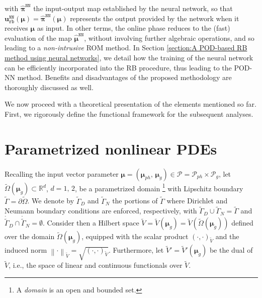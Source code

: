 \documentclass[12pt, a4paper, twoside, openright, notitlepage]{report}
\numberwithin{equation}{chapter}
\theoremstyle{theorem}
\theoremstyle{definition}
\theoremstyle{remark}
\theoremstyle{proposition}
\numberwithin{figure}{chapter}
\newcommand{\norm}[1]{\left\lVert#1\right\rVert}
\newcommand{\wt}[1]{\widetilde{#1}}
\newcommand{\bg}[1]{\boldsymbol{#1}}
\begin{document}
		with $\hat{\bg{\pi}}^{\texttt{NN}}$ the input-output map established by the neural network, so that $\mathbf{u}_{\texttt{rb}}^{\texttt{NN}}(\bg{\mu}) = \hat{\bg{\pi}}^{\texttt{NN}}(\bg{\mu})$ represents the output provided by the network when it receives $\bg{\mu}$ as input. In other terms, the online phase reduces to the (fast) evaluation of the map $\hat{\bg{\mu}}^{\texttt{NN}}$, without involving further algebraic operations, and so leading to a \emph{non-intrusive} ROM method. In Section \ref{section:A POD-based RB method using neural networks}, we detail how the training of the neural network can be efficiently incorporated into the RB procedure, thus leading to the POD-NN method. Benefits and disadvantages of the proposed methodology are thoroughly discussed as well.
		
		\vspace*{0.3cm}
		
		We now proceed with a theoretical presentation of the elements mentioned so far. First, we rigorously define the functional framework for the subsequent analyses. 
		
	\vspace*{0.3cm}
		
	\section{Parametrized nonlinear PDEs}
	\label{section:Parametrized nonlinear PDEs}
	
		Recalling the input vector parameter $\bg{\mu} = (\bg{\mu}_{ph}, \, \bg{\mu}_g) \in \mathcal{P} = \mathcal{P}_{ph} \times \mathcal{P}_g$, let $\wt{\Omega}(\boldsymbol{\mu}_g) \subset \mathbb{R}^d$, $d = 1, \, 2$, be a parametrized domain \footnote{A \emph{domain} is an open and bounded set.} with Lipschitz boundary $\wt{\Gamma} = \partial \wt{\Omega}$. We denote by $\wt{\Gamma}_D$ and $\wt{\Gamma}_N$ the portions of $\wt{\Gamma}$ where Dirichlet and Neumann boundary conditions are enforced, respectively, with $\wt{\Gamma}_D \cup \wt{\Gamma}_N = \wt{\Gamma}$ and $\mathring{\wt{\Gamma}}_D \cap \mathring{\wt{\Gamma}}_N = \emptyset$. Consider then a Hilbert space $\wt{V} = \wt{V}(\bg{\mu}_g) = \wt{V}(\wt{\Omega}(\boldsymbol{\mu}_g))$ defined over the domain $\wt{\Omega}(\boldsymbol{\mu}_g)$, equipped with the scalar product $(\cdot,\cdot)_{\wt{V}}$ and the induced norm $\norm{\cdot}_{\wt{V}} = \sqrt{(\cdot,\cdot)_{\wt{V}}}$. Furthermore, let $\wt{V}' = \wt{V}'(\boldsymbol{\mu}_g)$ be the dual of $\wt{V}$, i.e., the space of linear and continuous functionals over $\wt{V}$.
		
\end{document}
